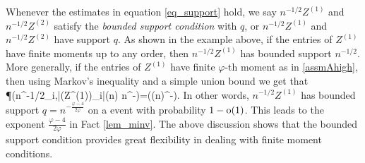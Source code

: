 Whenever the estimates in equation \eqref{eq_support} hold, we say $n^{-1/2}Z^{(1)}$ and $n^{-1/2}Z^{(2)}$ satisfy the {\it{bounded support condition}} with $q$, or $n^{-1/2}Z^{(1)}$ and $n^{-1/2}Z^{(2)}$ have support $q$.
As shown in the example above, if the entries of $Z^{(1)}$ have finite moments up to any order, %
then $n^{-1/2}Z^{(1)}$ has bounded support $n^{-1/2}$. More generally, if the entries of $Z^{(1)}$ have finite $\varphi$-th moment as in \eqref{assmAhigh}, then using Markov's inequality and a simple union bound we get that
\be\label{Ptrunc}
\P\left(n^{-1/2}\max_{i,\mu}|(Z^{(1)})_{\mu i}|\ge (\log n) n^{-}\right)=\OO((\log n)^{-\varphi}).\ee
In other words, $n^{-1/2}Z^{(1)}$ has bounded support $q=n^{-\frac{\varphi-4}{2\varphi}}$ on a event with probability $1-\operatorname{o}(1)$. This leads to the exponent $\frac{\varphi-4}{2\varphi}$ in Fact \ref{lem_minv}. %
The above discussion shows that the bounded support condition provides great flexibility in dealing with finite moment conditions.



